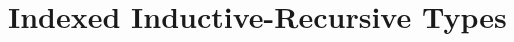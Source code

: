 \documentclass[12pt]{report}
\theoremstyle{definition}
\theoremstyle{remark}
\numberwithin{definition}{section}
\numberwithin{equation}{section}
\numberwithin{proposition}{section}
\numberwithin{conjecture}{section}
\numberwithin{theorem}{section}
\numberwithin{lemma}{section}
\numberwithin{corollary}{section}
\numberwithin{example}{section}
\numberwithin{remark}{section}
\begin{document}





\section{Indexed Inductive-Recursive Types}\label{sec:iiralg}







\end{document}
